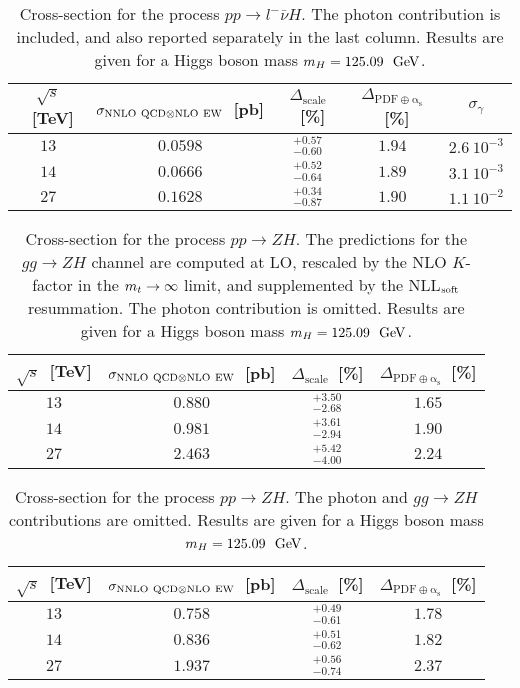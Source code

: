  \begin{table}
\centering
\begin{tabular}{cccc|c}
\toprule
$\sqrt{s}$~[TeV] & $\sigma_{{\rm NNLO~QCD}\otimes{\rm NLO~EW}}$~[pb] & $\Delta_{\mathrm{scale}}$~[\%] &
$\Delta_{\mathrm{PDF\oplus\alpha_s}}$~[\%] & $\sigma_\gamma$\\
\midrule
$13$ & $0.0598$ & $^{+0.57}_{-0.60}$ & $1.94$ & $2.6~10^{-3}$ \\
$14$ & $0.0666$ & $^{+0.52}_{-0.64}$ & $1.89$ & $3.1~10^{-3}$ \\
$27$ & $0.1628$ & $^{+0.34}_{-0.87}$ & $1.90$ & $1.1~10^{-2}$\\
\bottomrule
\end{tabular}
\caption{Cross-section for the process $p p \to l^-\bar\nu H$. 
The photon contribution is included, and also reported separately in the last column. 
Results are given for a Higgs boson mass $m_H = 125.09~{\rm ~\text{GeV}}$.}
\label{tab:l-nuh_xsec}
\end{table}

\begin{table}
\centering
\begin{tabular}{cccc}
\toprule
$\sqrt{s}$~[TeV] & $\sigma_{{\rm NNLO~QCD}\otimes{\rm NLO~EW}}$~[pb] & $\Delta_{\mathrm{scale}}$~[\%] &
$\Delta_{\mathrm{PDF\oplus\alpha_s}}$~[\%] \\
\midrule
$13$ & $0.880$ & $^{+3.50}_{-2.68}$ & $1.65$ \\
$14$ & $0.981$ & $^{+3.61}_{-2.94}$ & $1.90$ \\
$27$ & $2.463$ & $^{+5.42}_{-4.00}$ & $2.24$ \\
\bottomrule
\end{tabular}
\caption{Cross-section for the process $p p \to ZH$. The predictions for the $gg\to ZH$ channel are computed 
at LO, rescaled by the NLO $K$-factor in the $m_t \to \infty$ limit,
and supplemented by the NLL$_{\rm soft}$ resummation. The photon contribution is
omitted.  Results are given for a Higgs boson mass $m_H = 125.09~{\rm ~\text{GeV}}$.}
\label{tab:ZH_xsec}
\end{table}

\begin{table}
\centering
\begin{tabular}{cccc}
\toprule
$\sqrt{s}$~[TeV] & $\sigma_{{\rm NNLO~QCD}\otimes{\rm NLO~EW}}$~[pb] & $\Delta_{\mathrm{scale}}$~[\%] &
$\Delta_{\mathrm{PDF\oplus\alpha_s}}$~[\%] \\
\midrule
$13$ & $0.758$ & $^{+0.49}_{-0.61}$ & $1.78$ \\
$14$ & $0.836$ & $^{+0.51}_{-0.62}$ & $1.82$ \\
$27$ & $1.937$ & $^{+0.56}_{-0.74}$ & $2.37$ \\
\bottomrule
\end{tabular}
\caption{Cross-section for the process $p p \to ZH$. The photon 
and $gg\to ZH$ contributions are omitted. Results are given for a Higgs boson mass $m_H = 125.09~{\rm ~\text{GeV}}$.}
\label{tab:ZHnogg_xsec}
\end{table}

